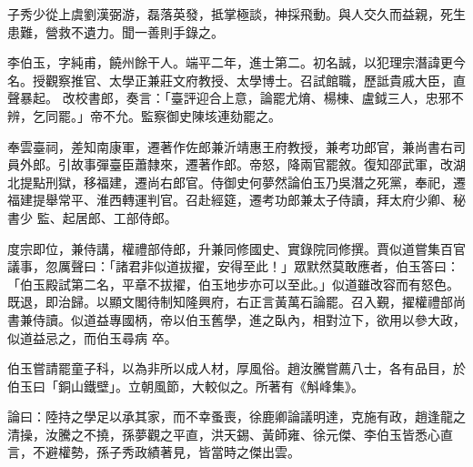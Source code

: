 \begin{pinyinscope}
 子秀少從上虞劉漢弼游，磊落英發，抵掌極談，神採飛動。與人交久而益親，死生患難，營救不遺力。聞一善則手錄之。



 李伯玉，字純甫，饒州餘干人。端平二年，進士第二。初名誠，以犯理宗潛諱更今名。授觀察推官、太學正兼莊文府教授、太學博士。召試館職，歷詆貴戚大臣，直聲暴起。
 改校書郎，奏言：「臺評迎合上意，論罷尤焴、楊棟、盧鉞三人，忠邪不辨，乞同罷。」帝不允。監察御史陳垓連劾罷之。



 奉雲臺祠，差知南康軍，遷著作佐郎兼沂靖惠王府教授，兼考功郎官，兼尚書右司員外郎。引故事彈臺臣蕭隸來，遷著作郎。帝怒，降兩官罷敘。復知邵武軍，改湖北提點刑獄，移福建，遷尚右郎官。侍御史何夢然論伯玉乃吳潛之死黨，奉祀，遷福建提舉常平、淮西轉運判官。召赴經筵，遷考功郎兼太子侍讀，拜太府少卿、秘書少
 監、起居郎、工部侍郎。



 度宗即位，兼侍講，權禮部侍郎，升兼同修國史、實錄院同修撰。賈似道嘗集百官議事，忽厲聲曰：「諸君非似道拔擢，安得至此！」眾默然莫敢應者，伯玉答曰：「伯玉殿試第二名，平章不拔擢，伯玉地步亦可以至此。」似道雖改容而有怒色。既退，即治歸。以顯文閣待制知隆興府，右正言黃萬石論罷。召入覲，擢權禮部尚書兼侍讀。似道益專國柄，帝以伯玉舊學，進之臥內，相對泣下，欲用以參大政，似道益忌之，而伯玉尋病
 卒。



 伯玉嘗請罷童子科，以為非所以成人材，厚風俗。趙汝騰嘗薦八士，各有品目，於伯玉曰「銅山鐵壁」。立朝風節，大較似之。所著有《斛峰集》。



 論曰：陸持之學足以承其家，而不幸蚤喪，徐鹿卿論議明達，克施有政，趙逢龍之清操，汝騰之不撓，孫夢觀之平直，洪天錫、黃師雍、徐元傑、李伯玉皆悉心直言，不避權勢，孫子秀政績著見，皆當時之傑出雲。



\end{pinyinscope}